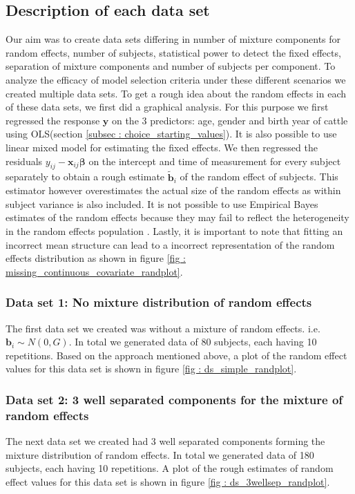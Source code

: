 \subsection{Description of each data set}
\label{subsec : ds_description}
Our aim was to create data sets differing in number of mixture components for random effects, number of subjects, statistical power to detect the fixed effects, separation of mixture components and number of subjects per component. To analyze the efficacy of model selection criteria under these different scenarios we created multiple data sets. To get a rough idea about the random effects in each of these data sets, we first did a graphical analysis. For this purpose we first regressed the response $\boldsymbol{y}$ on the 3 predictors: age, gender and birth year of cattle using OLS(section \ref{subsec : choice_starting_values}). It is also possible to use linear mixed model for estimating the fixed effects. We then regressed the residuals $y_{ij} - \boldsymbol{x}_{ij}\boldsymbol{\beta}$ on the intercept and time of measurement for every subject separately to obtain a rough estimate $\boldsymbol{\tilde{b}}_i$ of the random effect of subjects. This estimator however overestimates the actual size of the random effects as within subject variance is also included. It is not possible to use Empirical Bayes estimates of the random effects because they may fail to reflect the heterogeneity in the random effects population \citep{verbeke_linear_1996}. Lastly, it is important to note that fitting an incorrect mean structure can lead to a incorrect representation of the random effects distribution as shown in figure \ref{fig : missing_continuous_covariate_randplot}.

\subsubsection{Data set 1: No mixture distribution of random effects}
\label{subsubsec : ds_simple}
The first data set we created was without a mixture of random effects. i.e. $\boldsymbol{b}_i \sim N(0, G)$. In total we generated data of 80 subjects, each having 10 repetitions. Based on the approach mentioned above, a plot of the random effect values for this data set is shown in figure \ref{fig : ds_simple_randplot}.

\subsubsection{Data set 2: 3 well separated components for the mixture of random effects}
\label{subsubsec : ds_3wellsep}
The next data set we created had 3 well separated components forming the mixture distribution of random effects. In total we generated data of 180 subjects, each having 10 repetitions. A plot of the rough estimates of random effect values for this data set is shown in figure \ref{fig : ds_3wellsep_randplot}.

